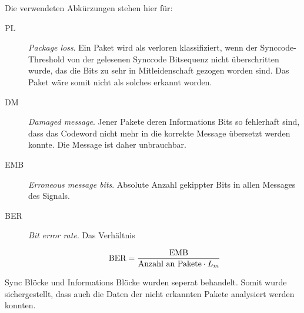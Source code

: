 Die verwendeten Abkürzungen stehen hier für:

\begin{description}
	
\item[PL] \textit{Package loss}. Ein Paket wird als verloren klassifiziert, wenn der Synccode-Threshold von der gelesenen Synccode Bitsequenz nicht überschritten wurde, das die Bits zu sehr in Mitleidenschaft gezogen worden sind. Das Paket wäre somit nicht als solches erkannt worden. 

\item[DM] \textit{Damaged message}. Jener Pakete deren Informations Bits so fehlerhaft sind, dass das Codeword nicht mehr in die korrekte Message übersetzt werden konnte. Die Message ist daher unbrauchbar.

\item[EMB] \textit{Erroneous message bits}. Absolute Anzahl gekippter Bits in allen Messages des Signals. 

\item[BER] \textit{Bit error rate}. Das Verhältnis 

	\begin{equation}
		\mbox{BER} = {\mbox{EMB} \over \mbox{Anzahl an Pakete} \cdot {L}_{m}}
		\label{equ:ber}
	\end{equation}
\end{description}

Sync Blöcke  und Informations Blöcke wurden seperat behandelt. Somit wurde sichergestellt, dass auch die Daten der nicht erkannten Pakete analysiert werden konnten.  

		
		
		

